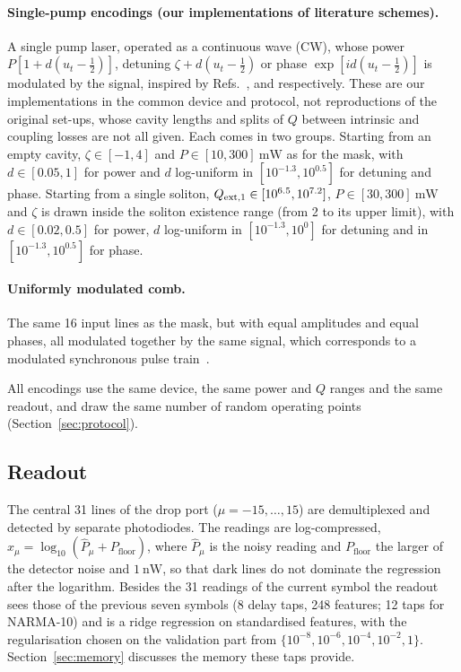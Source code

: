 \paragraph{Single-pump encodings (our implementations of literature schemes).}
A single pump laser, operated as a continuous wave (CW), whose power $P[1+d(u_t-\tfrac12)]$, detuning $\zeta+d(u_t-\tfrac12)$ or phase $\exp[i d(u_t-\tfrac12)]$ is
modulated by the signal, inspired by Refs.~\cite{shishavan2025}, \cite{cuevas2025} and \cite{arabieh2026soliton} respectively.
These are our implementations in the common device and protocol, not reproductions of the original set-ups, whose cavity lengths
and splits of $Q$ between intrinsic and coupling losses are not all given. Each comes in two groups. Starting from an empty cavity, $\zeta\in[-1,4]$
and $P\in[10,300]~\mathrm{mW}$ as for the mask, with $d\in[0.05,1]$ for power and $d$ log-uniform in $[10^{-1.3},10^{0.5}]$ for
detuning and phase. Starting from a single soliton, $Q_{\mathrm{ext},1}\in[10^{6.5},10^{7.2}]$, $P\in[30,300]~\mathrm{mW}$ and $\zeta$ is
drawn inside the soliton existence range (from 2 to its upper limit), with $d\in[0.02,0.5]$ for power, $d$ log-uniform in
$[10^{-1.3},10^{0}]$ for detuning and in $[10^{-1.3},10^{0.5}]$ for phase.

\paragraph{Uniformly modulated comb.}
The same 16 input lines as the mask, but with equal amplitudes and equal phases, all modulated together by the same signal, which
corresponds to a modulated synchronous pulse train~\cite{arabieh2026pulse}.

All encodings use the same device, the same power and $Q$ ranges and the same readout, and draw the same number of random
operating points (Section~\ref{sec:protocol}).

\subsection{Readout}\label{sec:readout-def}

The central 31 lines of the drop port ($\mu=-15,\dots,15$) are demultiplexed and detected by separate photodiodes.
The readings are log-compressed, $x_\mu=\log_{10}(\hat P_\mu+P_\mathrm{floor})$, where $\hat P_\mu$ is the noisy reading and
$P_\mathrm{floor}$ the larger of the detector noise and $1~\mathrm{nW}$, so that dark lines do not dominate the regression after
the logarithm. Besides the 31 readings of the current symbol the readout sees those of the previous seven symbols (8 delay taps,
248 features; 12 taps for NARMA-10) and is a ridge regression on standardised features, with the regularisation chosen on the
validation part from $\{10^{-8},10^{-6},10^{-4},10^{-2},1\}$. Section~\ref{sec:memory} discusses the memory these taps provide.

